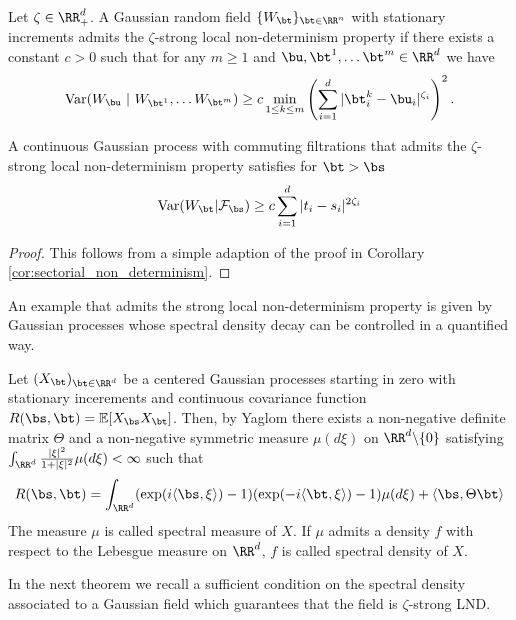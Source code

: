 \begin{defn} \cite[Section 2.4, (C3')]{Xiao} Let $\zeta\in \RR^d_+$. A Gaussian random field $\{W_\bt\}_{\bt\in \RR^n}$ with stationary increments admits the $\zeta$-strong local non-determinism property if there exists a constant $c>0$ such that for any $m\geq 1$ and $\bu, \bt^1, \dots \bt^m\in \RR^d$ we have
\begin{equation*}
    \mbox{Var}(W_\bu\ |\ W_{\bt^1}, \dots W_{\bt^m})\geq  c\min_{1\leq k\leq m}\left(\sum_{i=1}^d |\bt^k_i-\bu_i|^{\zeta_i}\right)^2. 
\end{equation*}
\end{defn}
 \begin{cor}
        A continuous Gaussian process with commuting filtrations that admits the $\zeta$-strong local non-determinism property satisfies for $\bt>\bs$
        \begin{equation}
            \mbox{Var}(W_\bt| \mathcal{F}_\bs)\geq c\sum_{i=1}^d |t_i-s_i|^{2\zeta_i}
            \label{strong LND impli}
        \end{equation}
    \end{cor}
    \begin{proof}
        This follows from a simple adaption of the  proof in Corollary \ref{cor:sectorial_non_determinism}. 
    \end{proof}
An example that admits the strong local non-determinism property is given by Gaussian processes whose spectral density decay can be controlled in a quantified way.
\begin{defn}
    Let $(X_\bt)_{\bt\in \RR^d}$ be a centered Gaussian processes starting in zero with stationary incerements and continuous covariance function $R(\bs, \bt)=\mathbb{E}[X_\bs X_\bt]$. Then, by Yaglom \cite{Yaglom1957} there exists a non-negative definite matrix $\Theta$ and a non-negative symmetric measure $\mu(d\xi)$ on $\RR^d\backslash\{0\}$ satisfying $\int_{\RR^d}\frac{|\xi|^2}{1+|\xi|^2}\mu(d\xi)<\infty$ such that 
    \[
    R(\bs, \bt)=\int_{\RR^d}(\exp(i\langle \bs, \xi\rangle)-1)(\exp(-i\langle \bt, \xi\rangle)-1)\mu(d\xi)+\langle \bs, \Theta \bt\rangle
    \]
    The measure $\mu$ is called spectral measure of $X$. If $\mu$ admits a density $f$ with respect to the Lebesgue measure on $\RR^d$, $f$ is called spectral density of $X$. 
\end{defn}

In the next theorem we recall a sufficient condition on the spectral density associated to a Gaussian field which guarantees that the field is $\zeta$-strong LND. 

